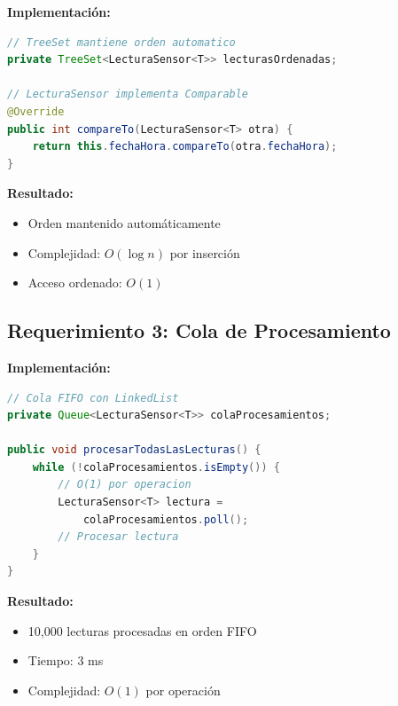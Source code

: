 \documentclass[12pt,a4paper]{article}
\begin{document}
\begin{tcolorbox}[colback=green!5,colframe=green!75!black,title=Cumplido]
\textbf{Implementación:}

\begin{lstlisting}[language=Java]
// TreeSet mantiene orden automatico
private TreeSet<LecturaSensor<T>> lecturasOrdenadas;

// LecturaSensor implementa Comparable
@Override
public int compareTo(LecturaSensor<T> otra) {
    return this.fechaHora.compareTo(otra.fechaHora);
}
\end{lstlisting}

\textbf{Resultado:}
\begin{itemize}
    \item[$\bullet$] Orden mantenido automáticamente
    \item[$\bullet$] Complejidad: $O(\log n)$ por inserción
    \item[$\bullet$] Acceso ordenado: $O(1)$
\end{itemize}
\end{tcolorbox}

\subsection{Requerimiento 3: Cola de Procesamiento}

\begin{tcolorbox}[colback=green!5,colframe=green!75!black,title=Cumplido]
\textbf{Implementación:}

\begin{lstlisting}[language=Java]
// Cola FIFO con LinkedList
private Queue<LecturaSensor<T>> colaProcesamientos;

public void procesarTodasLasLecturas() {
    while (!colaProcesamientos.isEmpty()) {
        // O(1) por operacion
        LecturaSensor<T> lectura = 
            colaProcesamientos.poll();
        // Procesar lectura
    }
}
\end{lstlisting}

\textbf{Resultado:}
\begin{itemize}
    \item[$\bullet$] 10,000 lecturas procesadas en orden FIFO
    \item[$\bullet$] Tiempo: 3 ms
    \item[$\bullet$] Complejidad: $O(1)$ por operación
\end{itemize}
\end{tcolorbox}

\end{document}
